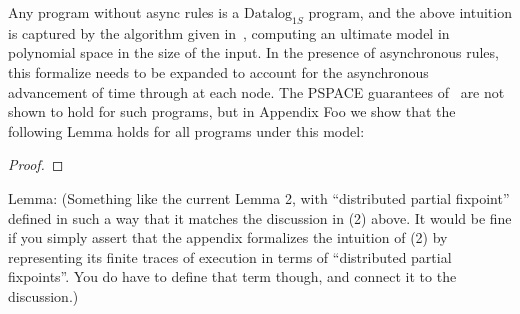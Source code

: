 Any \lang program without  async rules is a $\text{Datalog}_{1S}$ program, and the above intuition is captured by the algorithm given in~\cite{tdd}, computing an ultimate model in polynomial space in the size of the input.  In the presence of asynchronous rules, this formalize needs to be expanded to account for the asynchronous advancement of time through  at each node.  The PSPACE guarantees of~\cite{tdd} are not shown to hold for such programs, but in Appendix Foo we show that the following Lemma holds for all \lang programs under this model:

\begin{lemma}

\end{lemma}
\begin{proof}

\end{proof}

Lemma:  (Something like the current Lemma 2, with ``distributed partial fixpoint'' defined in such a way that it matches the discussion in (2) above. It would be fine if you simply
assert that the appendix formalizes the intuition of (2) by representing its finite traces of execution in terms of ``distributed partial fixpoints''.  You do have to define that
term though, and connect it to the discussion.)






